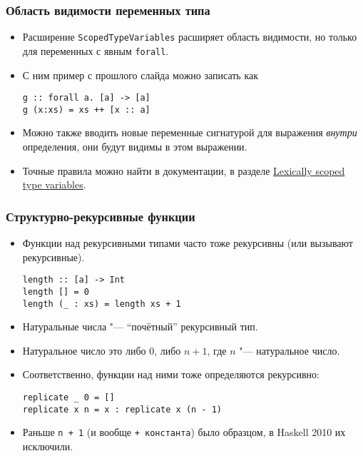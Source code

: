 \documentclass[10pt]{beamer}
\begin{document}
\begin{frame}[fragile]
\frametitle{Область видимости переменных типа}
\begin{itemize}
    \item Расширение \lstinline|ScopedTypeVariables| расширяет область видимости, но только для переменных с явным \lstinline|forall|.
    \item С ним пример с прошлого слайда можно записать как
\begin{lstlisting}
g :: forall a. [a] -> [a]
g (x:xs) = xs ++ [x :: a]
\end{lstlisting}
    \item Можно также вводить новые переменные сигнатурой для выражения \emph{внутри} определения, они будут видимы в этом выражении.
    \item Точные правила можно найти в документации, в разделе \href{http://downloads.haskell.org/~ghc/latest/docs/html/users_guide/glasgow_exts.html#lexically-scoped-type-variables}{Lexically scoped type variables}.
\end{itemize}
\end{frame}

\begin{frame}[fragile]
\frametitle{Структурно-рекурсивные функции}
\begin{itemize}
    \item Функции над рекурсивными типами часто тоже рекурсивны (или вызывают рекурсивные).
\begin{lstlisting}
length :: [a] -> Int
length [] = 0
length (_ : xs) = length xs + 1
\end{lstlisting}
    \item Натуральные числа "--- \enquote{почётный} рекурсивный тип.
    \pause
    \item Натуральное число это либо $0$, либо $n + 1$, где $n$ "--- натуральное число.
    \item Соответственно, функции над ними тоже определяются рекурсивно:
\begin{lstlisting}
replicate _ 0 = []
replicate x n = x : replicate x (n - 1)
\end{lstlisting}
\item Раньше \lstinline|n + 1| (и вообще \lstinline|+ константа|) было образцом, в Haskell 2010 их исключили.
\end{itemize}
\end{frame}
\end{document}
